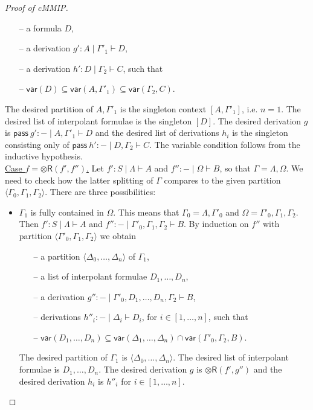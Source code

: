\documentclass[sn-mathphys-num]{sn-jnl}%
\newcommand{\GG}{\Gamma}
\newcommand{\GD}{\Delta}
\newcommand{\GL}{\Lambda}
\newcommand{\GO}{\Omega}
\newcommand{\vd}{\vdash}
\newcommand{\tr}{\otimes\mathsf{R}}
\newcommand{\pass}{\mathsf{pass}}
\newcommand{\mf}[1]{\mathsf{#1}}
\newcommand{\vars}[1]{\mf{var} (#1)}
\newcommand{\cMMIP}{\textsf{cMMIP}}
\theoremstyle{thmstyleone}%
\theoremstyle{thmstyletwo}%
\theoremstyle{thmstylethree}%
\begin{document}
\begin{proof}[Proof of \cMMIP]
  \begin{itemize}
    \item[--] a formula $D$,
    \item[--] a derivation $g': A \mid \GG'_1 \vd D$,
    \item[--] a derivation $h' : D \mid \GG_2 \vd C$, such that
    \item[--] $\vars{D} \subseteq \vars{A , \GG'_1} \subseteq \vars{\GG_2 , C}$.
  \end{itemize}
  The desired partition of $A,\GG'_1$ is the singleton context $[A,\GG'_1]$, i.e. $n = 1$.
  The desired list of interpolant formulae is the singleton $[D]$.
  The desired derivation $g$ is $\pass \ g' : {-} \mid A , \GG'_1 \vd D$ and the desired list of derivations $h_i$ is the singleton consisting only of $\pass \ h' : {-} \mid D, \GG_2 \vd C$.
  The variable condition follows from the inductive hypothesis.
  \\
  \underline{Case $f = \tr (f' , f'')$.}
  Let $f' : S \mid \GL \vd A$ and $f'' : {-} \mid \GO \vd B$, so that $\GG = \GL,\GO$.
  We need to check how the latter splitting of $\GG$ compares to the given partition $\langle \GG_0 , \GG_1, \GG_2 \rangle$.
  There are three possibilities:
  \begin{itemize}
    \item $\GG_1$ is fully contained in $\GO$.
    This means that $\GG_0 = \GL , \GG'_0$ and $\GO = \GG'_0 , \GG_1 , \GG_2$.
    Then $f' : S \mid \GL \vd A$ and $f'' : {-} \mid \GG'_0 , \GG_1 , \GG_2 \vd B$.
    By induction on $f''$ with partition $\langle \GG'_0 , \GG_1 , \GG_2 \rangle$ we obtain
    \begin{itemize}
      \item[--] a partition $\langle \GD_0, \dots , \GD_n \rangle$ of $\GG_1$,
      \item[--] a list of interpolant formulae $D_1, \dots , D_n$,
      \item[--] a derivation $g'' : {-} \mid \GG'_0 , D_1 , \dots , D_n , \GG_2 \vd B$,
      \item[--] derivations $h''_i : {-} \mid \GD_i \vd D_i$, for $i \in [1,\dots , n]$, such that
      \item[--] $\vars{D_1, \dots , D_n} \subseteq \vars{\GD_1 , \dots , \GD_n} \cap \vars{ \GG'_0 , \GG_2 , B}$.
    \end{itemize}
    The desired partition of $\GG_1$ is $\langle \GD_0, \dots , \GD_n \rangle$. The desired list of interpolant formulae is $D_1,\dots,D_n$.
    The desired derivation $g$ is $\tr (f' , g'')$ and the desired derivation $h_i$ is  $h''_i$ for $i \in [1,\dots , n]$.

\end{itemize}
\end{proof}
\end{document}
